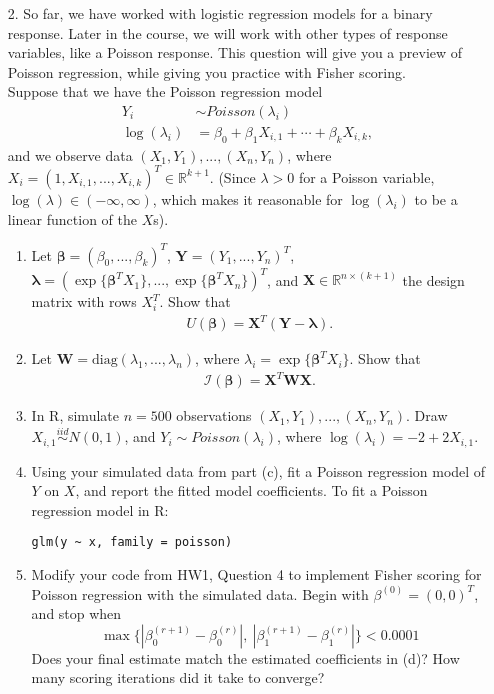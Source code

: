 \documentclass[11pt]{article}
\begin{document}
\begin{enumerate}
\item[2.] So far, we have worked with logistic regression models for a binary response. Later in the course, we will work with other types of response variables, like a Poisson response. This question will give you a preview of Poisson regression, while giving you practice with Fisher scoring. \\

Suppose that we have the Poisson regression model
\begin{align*}
Y_i &\sim Poisson(\lambda_i) \\
\log(\lambda_i) &= \beta_0 + \beta_1X_{i,1} + \cdots + \beta_k X_{i,k},
\end{align*}
and we observe data $(X_1, Y_1),...,(X_n, Y_n)$, where $X_i = (1, X_{i,1},...,X_{i,k})^T \in \mathbb{R}^{k+1}$. (Since $\lambda > 0$ for a Poisson variable, $\log(\lambda) \in (-\infty, \infty)$, which makes it reasonable for $\log(\lambda_i)$ to be a linear function of the $X$s).

\begin{enumerate}
\item Let $\bm{\beta} = (\beta_0,...,\beta_k)^T$, $\bm{Y} = (Y_1,...,Y_n)^T$, $\bm{\lambda} = (\exp\{ \bm{\beta}^T X_1 \}, ..., \exp\{ \bm{\beta}^T X_n \})^T$, and $\mathbf{X} \in \mathbb{R}^{n \times (k+1)}$ the design matrix with rows $X_i^T$. Show that
\begin{align*}
U(\bm{\beta}) = \mathbf{X}^T(\bm{Y} - \bm{\lambda}).
\end{align*}

\item Let $\bm{W} = \text{diag}(\lambda_1,...,\lambda_n)$, where $\lambda_i = \exp\{ \bm{\beta}^T X_i \}$. Show that
\begin{align*}
\mathcal{I}(\bm{\beta}) = \bm{X}^T \bm{W} \bm{X}.
\end{align*}

\item In R, simulate $n = 500$ observations $(X_1, Y_1),...,(X_n, Y_n)$. Draw $X_{i,1} \overset{iid}{\sim} N(0, 1)$, and $Y_i \sim Poisson(\lambda_i)$, where $\log(\lambda_i) = -2 + 2 X_{i,1}$. 

\item Using your simulated data from part (c), fit a Poisson regression model of $Y$ on $X$, and report the fitted model coefficients. To fit a Poisson regression model in R: 

\begin{verbatim}
glm(y ~ x, family = poisson)
\end{verbatim}

\item Modify your code from HW1, Question 4 to implement Fisher scoring for Poisson regression with the simulated data. Begin with $\beta^{(0)} = (0, 0)^T$, and stop when
$$\max \{ |\beta_0^{(r+1)} - \beta_0^{(r)}|, \ |\beta_1^{(r+1)} - \beta_1^{(r)}| \} < 0.0001$$
Does your final estimate match the estimated coefficients in (d)? How many scoring iterations did it take to converge?
\end{enumerate}

\end{enumerate}
\end{document}
